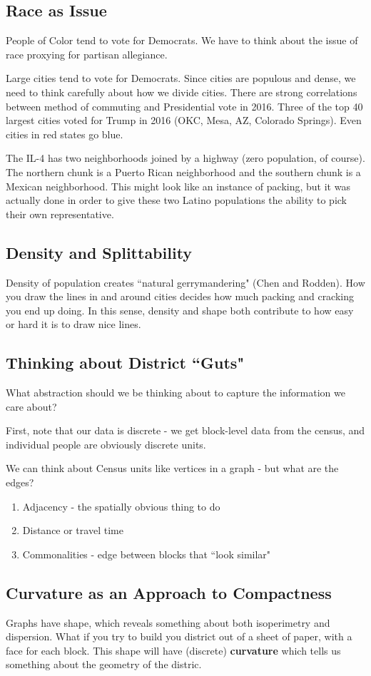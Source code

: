 \subsection*{Race as Issue}

People of Color tend to vote for Democrats. We have to think about the issue of race proxying for partisan allegiance.

 Large cities tend to vote for Democrats.  Since cities are populous and dense, we need to think carefully about how we divide cities.  There are strong correlations between method of commuting and Presidential vote in 2016.  Three of the top 40 largest cities voted for Trump in 2016 (OKC, Mesa, AZ, Colorado Springs).  Even cities in red states go blue.
 
 The IL-4 has two neighborhoods joined by a highway (zero population, of course).  The northern chunk is a Puerto Rican neighborhood and the southern chunk is a Mexican neighborhood.  This might look like an instance of packing, but it was actually done in order to give these two Latino populations the ability to pick their own representative.
 
\subsection*{Density and Splittability}

Density of population creates ``natural gerrymandering" (Chen and Rodden).  How you draw the lines in and around cities decides how much packing and cracking you end up doing.  In this sense, density and shape both contribute to how easy or hard it is to draw nice lines.


\subsection*{Thinking about District ``Guts"}

What abstraction should we be thinking about to capture the information we care about?

First, note that our data is discrete - we get block-level data from the census, and individual people are obviously discrete units.

We can think about Census units like vertices in a graph - but what are the edges?

\begin{enumerate}
	\item[] Adjacency - the spatially obvious thing to do
	\item[] Distance or travel time
	\item[] Commonalities - edge between blocks that ``look similar"
\end{enumerate}

\subsection*{Curvature as an Approach to Compactness}

Graphs have shape, which reveals something about both isoperimetry and dispersion.  What if you try to build you district out of a sheet of paper, with a face for each block.  This shape will have (discrete) \textbf{curvature} which tells us something about the geometry of the distric.